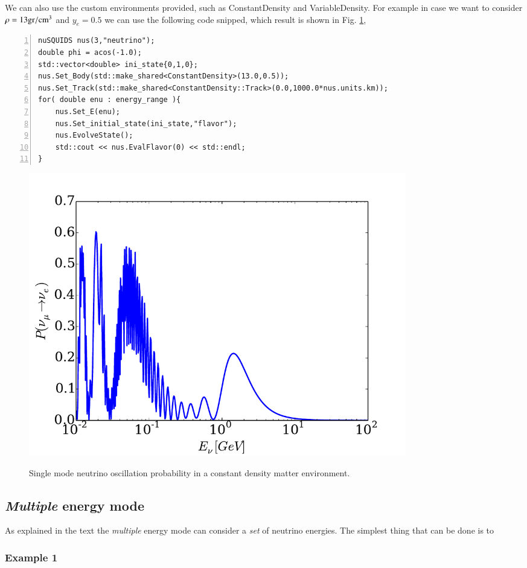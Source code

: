 \documentclass[3p,12pt,authoryear]{elsarticle}
\newcommand{\ttf}{\ttfamily}
\begin{document}
We can also use the custom environments provided, such as {\ttf ConstantDensity} and {\ttf VariableDensity}. For example in case we want to consider $\rho = 13 {\rm gr}/{\rm cm}^3$ and $y_e = 0.5$ we can use the following code snipped, which result is shown in Fig. \ref{fig:nu_mu_nue_single_energy},

\begin{lstlisting}[frame=leftline, numbers = left,breaklines=true]
nuSQUIDS nus(3,"neutrino");
double phi = acos(-1.0);
std::vector<double> ini_state{0,1,0};
nus.Set_Body(std::make_shared<ConstantDensity>(13.0,0.5));
nus.Set_Track(std::make_shared<ConstantDensity::Track>(0.0,1000.0*nus.units.km));
for( double enu : energy_range ){
	nus.Set_E(enu);
	nus.Set_initial_state(ini_state,"flavor");
	nus.EvolveState();
	std::cout << nus.EvalFlavor(0) << std::endl;
}
\end{lstlisting}

\begin{figure}[h]
\begin{center}
\label{fig:nu_mu_nue_single_energy}
\includegraphics[width=0.8\textwidth]{../fig/nu_mu_nue_single_energy.pdf}
\caption{Single mode neutrino oscillation probability in a constant density matter environment.}
\end{center}
\end{figure}

\subsection{{\it Multiple} energy mode}

As explained in the text the {\it multiple} energy mode can consider a {\it set} of neutrino energies. The simplest thing that can be done is to 

\subsubsection{Example 1}
\end{document}
